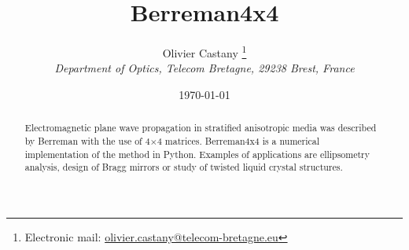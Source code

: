 \documentclass[a4paper, 10pt, oneside, twocolumn, openany]{memoir}
\begin{document}
\begin{titlingpage}

\pretitle{\begin{center}\Huge\sffamily\bfseries}
\posttitle{\par\end{center}\vskip 3.5cm}

\postauthor{\end{tabular}\par}

\postdate{\end{tabular}\par\vskip 1cm}

\usethanksrule
\thanksheadextra{(}{)}

\setlength{\absparindent}{0pt}
\makeatletter\renewcommand{\absnamepos}{@bstr@ctlist}\makeatother
\renewcommand{\abstractnamefont}{\normalfont\bfseries}
\renewcommand{\abstracttextfont}{\normalfont}

\title{Berreman4x4}

\author{\textsf{Olivier Castany}%
    \thanks{Electronic mail: 
    \href{mailto:olivier.castany@telecom-bretagne.eu}%
         {olivier.castany@telecom-bretagne.eu}}\\
    \emph{Department of Optics, Telecom Bretagne, 29238 Brest, France}
}

\date{\today}

\maketitle

\begin{abstract}
Electromagnetic plane wave propagation in stratified anisotropic media was described by Berreman with the use of 4$\times$4 matrices.
Berreman4x4 is a numerical implementation of the method in Python.
Examples of applications are ellipsometry analysis, design of Bragg mirrors or study of twisted liquid crystal structures.
\end{abstract}

\end{titlingpage}










\end{document}
